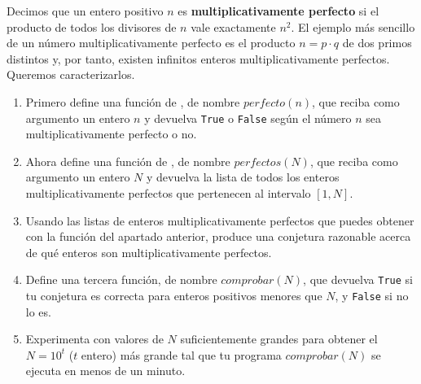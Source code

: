 		\begin{ejer}
			Decimos que un entero positivo $n$ es {\bf multiplicativamente perfecto} si el producto de todos los divisores de $n$ vale exactamente $n^2.$ El ejemplo m\'as sencillo de un n\'umero multiplicativamente perfecto es el producto $n=p\cdot q$ de dos primos distintos y, por tanto, existen infinitos enteros multiplicativamente perfectos. Queremos caracterizarlos.
			\begin{enumerate}
			\item Primero define una funci\'on de {\sage}, de nombre $perfecto(n)$, que reciba como argumento un entero $n$ y devuelva \lstinline|True| o \lstinline|False| seg\'un el n\'umero $n$ sea multiplicativamente perfecto o no.
			\item Ahora define una funci\'on de {\sage}, de nombre $perfectos(N)$, que reciba como argumento un entero $N$ y devuelva la lista de todos los enteros multiplicativamente perfectos que pertenecen al intervalo $[1,N].$
			\item Usando las listas de enteros multiplicativamente perfectos que puedes obtener con la funci\'on del apartado anterior, produce una conjetura razonable acerca de qu\'e enteros son multiplicativamente perfectos. 
			\item Define una tercera funci\'on, de nombre $comprobar(N)$, que devuelva \lstinline|True| si tu conjetura es correcta para enteros positivos menores que $N$, y \lstinline|False| si no lo es.
			\item Experimenta con valores de $N$ suficientemente grandes para obtener el $N=10^t$ ($t$ entero) m\'as grande tal que tu programa $comprobar(N)$ se ejecuta en menos de un minuto.
		\end{enumerate}
			
			\end{ejer}
			
